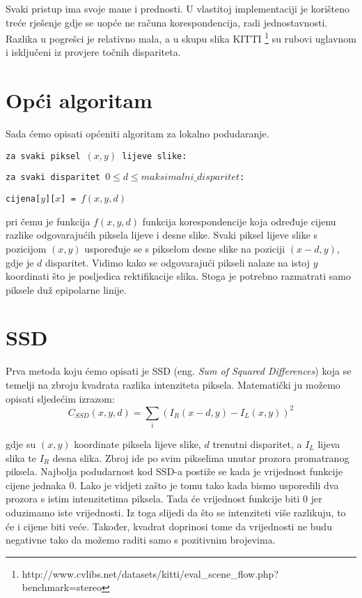 \documentclass[utf8, zavrsni, numeric]{fer}
\begin{document}
Svaki pristup ima svoje mane i prednosti. U vlastitoj implementaciji je korišteno treće rješenje gdje se uopće ne računa korespondencija, radi jednostavnosti. Razlika u pogrešci je relativno
mala, a u skupu slika KITTI \footnote{http://www.cvlibs.net/datasets/kitti/eval\_scene\_flow.php?benchmark=stereo} su rubovi uglavnom i isključeni iz provjere točnih dispariteta.

\section{Opći algoritam}
Sada ćemo opisati općeniti algoritam za lokalno podudaranje.

{\tt za svaki piksel $(x, y)$ lijeve slike:}

{\quad \tt za svaki disparitet $0 \leq d \leq maksimalni\_ disparitet$:}

{\quad\quad \tt cijena[$y$][$x$] = $f(x, y, d)$}    


\noindent pri čemu je funkcija $f(x, y, d)$ funkcija korespondencije koja određuje cijenu razlike odgovarajućih piksela lijeve i desne slike. Svaki piksel lijeve slike s pozicijom $(x, y)$
uspoređuje se s pikselom desne slike na poziciji $(x - d, y)$, gdje je $d$ disparitet. Vidimo kako se odgovarajući pikseli nalaze na istoj $y$ koordinati što je posljedica rektifikacije slika.
Stoga je potrebno razmatrati samo piksele duž epipolarne linije.

\section{SSD}

Prva metoda koju ćemo opisati je SSD ({eng. \sl Sum of Squared Differences}) koja se temelji na zbroju kvadrata razlika intenziteta piksela.
Matematički ju možemo opisati sljedećim izrazom:
$$C_{SSD}(x, y, d) = \sum_{i}(I_R(x - d, y) - I_L(x, y))^2 $$

gdje su $(x, y)$ koordinate piksela lijeve slike, $d$ trenutni disparitet, a $I_L$ lijeva slika te $I_R$ desna slika. Zbroj ide po svim pikselima unutar prozora promatranog piksela.
Najbolja podudarnost kod SSD-a postiže se kada je vrijednost funkcije cijene jednaka $0$. Lako je vidjeti zašto je tomu tako kada bismo usporedili dva prozora s istim intenzitetima piksela. Tada će vrijednost funkcije biti $0$ jer oduzimamo iste vrijednosti. Iz toga slijedi da što se intenziteti više razlikuju, to će i cijene biti veće. Također, kvadrat doprinosi tome da vrijednosti ne budu negativne tako da možemo raditi samo s pozitivnim brojevima.
\end{document}
